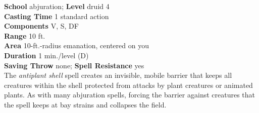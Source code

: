 \textbf{School} abjuration; \textbf{Level} druid 4\\
\textbf{Casting Time} 1 standard action\\
\textbf{Components} V, S, DF\\
\textbf{Range} 10 ft.\\
\textbf{Area} 10-ft.-radius emanation, centered on you\\
\textbf{Duration} 1 min./level (D)\\
\textbf{Saving Throw} none; \textbf{Spell Resistance} yes\\
The \textit{antiplant shell }spell creates an invisible, mobile barrier that keeps all creatures within the shell protected from attacks by plant creatures or animated plants. As with many abjuration spells, forcing the barrier against creatures that the spell keeps at bay strains and collapses the field.\\
